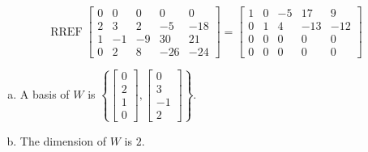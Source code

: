 \begin{exerciseAnswer} 


\[\operatorname{RREF} \left[\begin{array}{ccccc}
0 & 0 & 0 & 0 & 0 \\
2 & 3 & 2 & -5 & -18 \\
1 & -1 & -9 & 30 & 21 \\
0 & 2 & 8 & -26 & -24
\end{array}\right] = \left[\begin{array}{ccccc}
1 & 0 & -5 & 17 & 9 \\
0 & 1 & 4 & -13 & -12 \\
0 & 0 & 0 & 0 & 0 \\
0 & 0 & 0 & 0 & 0
\end{array}\right] \]


\begin{enumerate}[(a)]
\item A basis of \(W\) is \( \left\{ \left[\begin{array}{c}
0 \\
2 \\
1 \\
0
\end{array}\right] , \left[\begin{array}{c}
0 \\
3 \\
-1 \\
2
\end{array}\right] \right\} \).
\item The dimension of \(W\) is \( 2 \).
\end{enumerate}
    
\end{exerciseAnswer}
    
